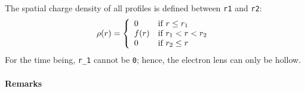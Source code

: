 \bigskip
\noindent The spatial charge density of all profiles is defined between \texttt{r1} and \texttt{r2}:
\begin{equation}
  \rho(r)=\left\{
    \begin{array}{ll}
        0 & \mbox{if $r \le r_1$} \\
        f(r) & \mbox{if $r_1 < r < r_2$} \\
        0 & \mbox{if $r_2 \le r$} \\
    \end{array}
    \right. \\
\end{equation}
For the time being, \texttt{r\_1} cannot be \texttt{0}; hence, the electron lens can only be hollow.

\paragraph{Remarks}~\\

